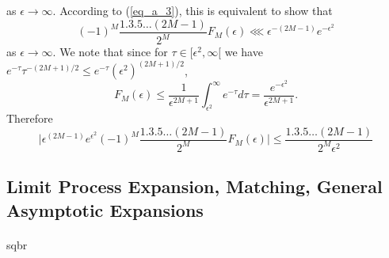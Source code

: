 \documentclass{article}
\begin{document}
\begin{appendices}
\begin{equation}
\end{equation}
%
as $\epsilon\rightarrow\infty$. According to (\ref{eq_a_3}), this is equivalent to show that 
%
\begin{equation}
(-1)^M\frac{1.3.5\ldots(2M-1)}{2^M}F_M(\epsilon) \lll \epsilon^{-(2M-1)}e^{-\epsilon^2}
\end{equation}
%
as $\epsilon\rightarrow\infty$. We note that since for $\tau\in [\epsilon^2,\infty[$ we have $e^{-\tau}\tau^{-(2M + 1) / 2}\leq e^{-\tau}(\epsilon^2)^{(2M+1)/2}$,
%
\begin{equation}
F_M(\epsilon) \leq\frac{1}{\epsilon^{2M+1}}\int^\infty_{\epsilon^2}e^{-\tau}d\tau = \frac{e^{-\epsilon^2}}{\epsilon^{2M+1}}.
\end{equation}
%
Therefore
%
\begin{equation}
\Big\vert\epsilon^{(2M-1)}e^{\epsilon^2}(-1)^M\frac{1.3.5\ldots(2M-1)}{2^M}F_M(\epsilon)\Big\vert \leq \frac{1.3.5\ldots(2M-1)}{2^M\epsilon^2} 
\end{equation}
%
\subsection{Limit Process Expansion, Matching, General Asymptotic Expansions}
\end{appendices}
%
\paragraph{} sqbr
\end{document}
